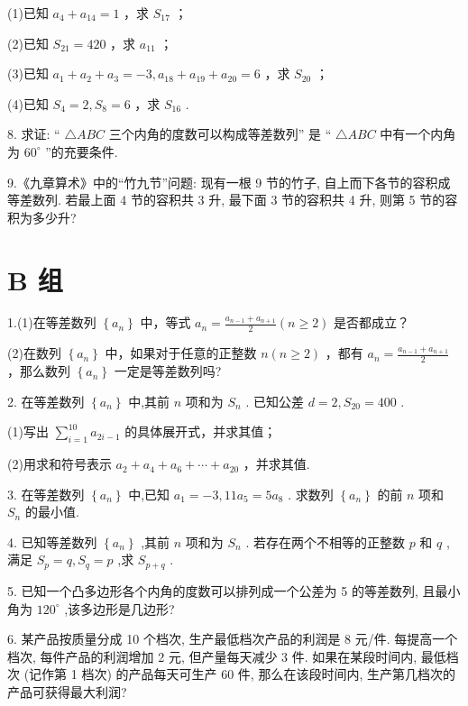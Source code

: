 \documentclass[10pt]{article}
\begin{document}
(1)已知 \({a}_{4} + {a}_{14} = 1\) ，求 \({S}_{17}\) ；

(2)已知 \({S}_{21} = {420}\) ，求 \({a}_{11}\) ；

(3)已知 \({a}_{1} + {a}_{2} + {a}_{3} =  - 3,{a}_{18} + {a}_{19} + {a}_{20} = 6\) ，求 \({S}_{20}\) ；

(4)已知 \({S}_{4} = 2,{S}_{8} = 6\) ，求 \({S}_{16}\) .

8. 求证: “ \(\bigtriangleup  {ABC}\) 三个内角的度数可以构成等差数列” 是 “ \(\bigtriangleup  {ABC}\) 中有一个内角为 \({60}^{ \circ  }\) ”的充要条件.

9.《九章算术》中的“竹九节”问题: 现有一根 9 节的竹子, 自上而下各节的容积成等差数列. 若最上面 4 节的容积共 3 升, 最下面 3 节的容积共 4 升, 则第 5 节的容积为多少升?

\section*{B 组}

1.(1)在等差数列 \(\left\{  {a}_{n}\right\}\) 中，等式 \({a}_{n} = \frac{{a}_{n - 1} + {a}_{n + 1}}{2}\left( {n \geq  2}\right)\) 是否都成立？

(2)在数列 \(\left\{  {a}_{n}\right\}\) 中，如果对于任意的正整数 \(n\left( {n \geq  2}\right)\) ，都有 \({a}_{n} = \frac{{a}_{n - 1} + {a}_{n + 1}}{2}\) ，那么数列 \(\left\{  {a}_{n}\right\}\) 一定是等差数列吗?

2. 在等差数列 \(\left\{  {a}_{n}\right\}\) 中,其前 \(n\) 项和为 \({S}_{n}\) . 已知公差 \(d = 2,{S}_{20} = {400}\) .

(1)写出 \(\mathop{\sum }\limits_{{i = 1}}^{{10}}{a}_{{2i} - 1}\) 的具体展开式，并求其值；

(2)用求和符号表示 \({a}_{2} + {a}_{4} + {a}_{6} + \cdots  + {a}_{20}\) ，并求其值.

3. 在等差数列 \(\left\{  {a}_{n}\right\}\) 中,已知 \({a}_{1} =  - 3,{11}{a}_{5} = 5{a}_{8}\) . 求数列 \(\left\{  {a}_{n}\right\}\) 的前 \(n\) 项和 \({S}_{n}\) 的最小值.

4. 已知等差数列 \(\left\{  {a}_{n}\right\}\) ,其前 \(n\) 项和为 \({S}_{n}\) . 若存在两个不相等的正整数 \(p\) 和 \(q\) ,满足 \({S}_{p} = q,{S}_{q} = p\) ,求 \({S}_{p + q}\) .

5. 已知一个凸多边形各个内角的度数可以排列成一个公差为 5 的等差数列, 且最小角为 \({120}^{ \circ  }\) ,该多边形是几边形?

6. 某产品按质量分成 10 个档次, 生产最低档次产品的利润是 8 元/件. 每提高一个档次, 每件产品的利润增加 2 元, 但产量每天减少 3 件. 如果在某段时间内, 最低档次 (记作第 1 档次) 的产品每天可生产 60 件, 那么在该段时间内, 生产第几档次的产品可获得最大利润?
\end{document}

